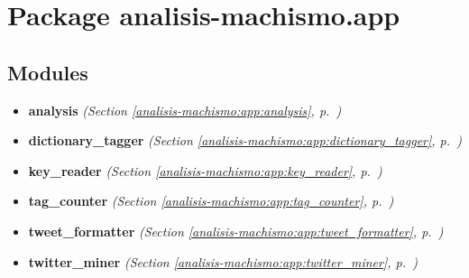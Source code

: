 %
%
%


\section{Package analisis-machismo.app}

    \label{analisis-machismo:app}


\subsection{Modules}

\begin{itemize}
\setlength{\parskip}{0ex}
\item \textbf{analysis}
  \textit{(Section \ref{analisis-machismo:app:analysis}, p.~\pageref{analisis-machismo:app:analysis})}

\item \textbf{dictionary\_tagger}
  \textit{(Section \ref{analisis-machismo:app:dictionary_tagger}, p.~\pageref{analisis-machismo:app:dictionary_tagger})}

\item \textbf{key\_reader}
  \textit{(Section \ref{analisis-machismo:app:key_reader}, p.~\pageref{analisis-machismo:app:key_reader})}

\item \textbf{tag\_counter}
  \textit{(Section \ref{analisis-machismo:app:tag_counter}, p.~\pageref{analisis-machismo:app:tag_counter})}

\item \textbf{tweet\_formatter}
  \textit{(Section \ref{analisis-machismo:app:tweet_formatter}, p.~\pageref{analisis-machismo:app:tweet_formatter})}

\item \textbf{twitter\_miner}
  \textit{(Section \ref{analisis-machismo:app:twitter_miner}, p.~\pageref{analisis-machismo:app:twitter_miner})}

\end{itemize}

